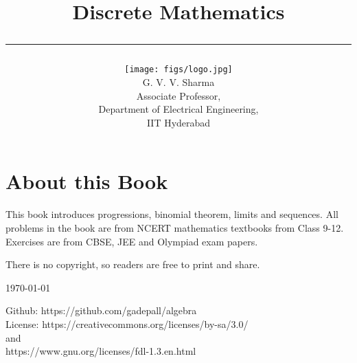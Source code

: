 \documentclass[journal]{IEEEtran}
\begin{document}

\onecolumn


\title{
	\begin{center}
	Discrete Mathematics
	\\
\rule{0.4\columnwidth}{0.4pt}
\end{center}
}
\author{
\vspace{11cm}
	\begin{center}
\texttt{[image: figs/logo.jpg]}
\\
		{\huge	G. V. V. Sharma}\\Associate Professor,\\Department of Electrical Engineering, \\ IIT Hyderabad
	\end{center}
}
\maketitle

\newpage
\section*{About this Book}

This book introduces progressions, binomial theorem, limits and sequences. 
 All problems in the book are from NCERT mathematics textbooks from Class 9-12.  Exercises are from CBSE, JEE and Olympiad exam papers.   

There is no copyright, so readers are free to print and share.  

\begin{flushright}
\today
\end{flushright}
Github: https://github.com/gadepall/algebra
		\\
License: https://creativecommons.org/licenses/by-sa/3.0/
\\
and
\\
https://www.gnu.org/licenses/fdl-1.3.en.html

\newpage
\end{document}
